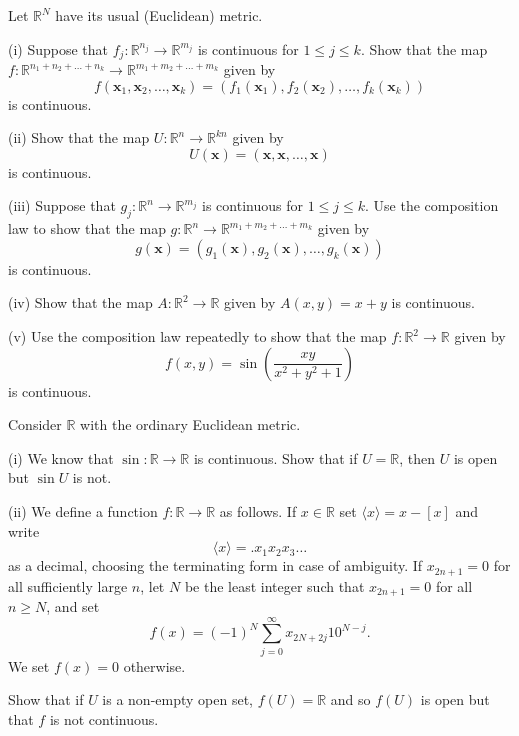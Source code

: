 \begin{exercise}\label{E;extend composition}
Let ${\mathbb R}^{N}$ have its usual (Euclidean) metric.

(i) Suppose that $f_{j}:{\mathbb R}^{n_{j}}\rightarrow{\mathbb R}^{m_{j}}$
is continuous for $1\leq j\leq k$. Show that the map 
$f:{\mathbb R}^{n_{1}+n_{2}+\dots+n_{k}}\rightarrow
{\mathbb R}^{m_{1}+m_{2}+\dots+m_{k}}$
given by
\[f({\mathbf x}_{1},{\mathbf x}_{2},\dots,{\mathbf x}_{k})
=(f_{1}({\mathbf x}_{1}),f_{2}({\mathbf x}_{2}),\dots,f_{k}({\mathbf x}_{k}))\]
is continuous.

(ii) Show that the map $U:{\mathbb R}^{n}\rightarrow{\mathbb R}^{kn}$
given by
\[U({\mathbf x})=({\mathbf x},{\mathbf x},\dots,{\mathbf x})\]
is continuous.

(iii)  Suppose that $g_{j}:{\mathbb R}^{n}\rightarrow{\mathbb R}^{m_{j}}$
is continuous for $1\leq j\leq k$.
Use the composition law to show that the map 
$g:{\mathbb R}^{n}\rightarrow
{\mathbb R}^{m_{1}+m_{2}+\dots+m_{k}}$
given by
\[g({\mathbf x})
=(g_{1}({\mathbf x}),g_{2}({\mathbf x}),\dots,g_{k}({\mathbf x}))\]
is continuous.

(iv) Show that the map $A:{\mathbb R}^{2}\rightarrow{\mathbb R}$
given by $A(x,y)=x+y$ is continuous.

(v) Use the composition law repeatedly to show that the map 
$f:{\mathbb R}^{2}\rightarrow{\mathbb R}$
given by
\[f(x,y)=\sin\left(\frac{xy}{x^{2}+y^{2}+1}\right)\]
is continuous.

\end{exercise}
\begin{exercise}\label{E;nasty discontinuous} 
Consider ${\mathbb R}$ with the ordinary 
Euclidean metric. 

(i) We know that $\sin:{\mathbb R}\rightarrow{\mathbb R}$
is continuous. Show that if $U={\mathbb R}$, then $U$ is open but $\sin U$
is not.

(ii) We define a function $f:{\mathbb R}\rightarrow{\mathbb R}$ as follows.
If $x\in{\mathbb R}$ set $\langle x\rangle=x-[x]$ and write
\[\langle x\rangle=.x_{1}x_{2}x_{3}\dots\]
as a decimal, choosing the terminating form in case of ambiguity.
If $x_{2n+1}=0$ for all sufficiently large $n$, let $N$ be the
least integer such that $x_{2n+1}=0$ for all $n\geq N$, and set
\[f(x)=(-1)^{N}\sum_{j=0}^{\infty}x_{2N+2j}10^{N-j}.\]
We set $f(x)=0$ otherwise.

Show that if $U$ is a non-empty open set,
$f(U)={\mathbb R}$ and so $f(U)$ is open but that $f$ is not 
continuous.
\end{exercise}
